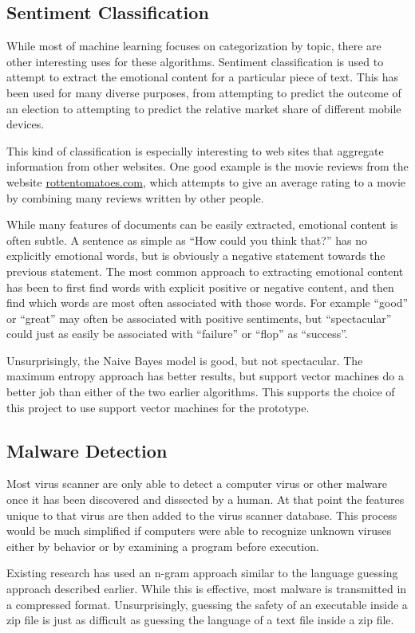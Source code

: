 \documentclass[12pt]{article}
\begin{document}
\subsection{Sentiment Classification}
While most of machine learning focuses on categorization by topic, there are other interesting uses for these
algorithms.  Sentiment classification is used to attempt to extract the emotional content for a particular
piece of text. This has been used for many diverse purposes, from attempting to predict the outcome of an
election to attempting to predict the relative market share of different mobile devices.

This kind of classification is especially interesting to web sites that aggregate information from other
websites. One good example is the movie reviews from the website \url{rottentomatoes.com}, which attempts to
give an average rating to a movie by combining many reviews written by other people. \cite{pang2002thumbs}

While many features of documents can be easily extracted, emotional content is often subtle. A sentence as
simple as ``How could you think that?'' has no explicitly emotional words, but is obviously a negative
statement towards the previous statement. The most common approach to extracting emotional content has been to
first find words with explicit positive or negative content, and then find which words are most often
associated with those words. For example ``good'' or ``great'' may often be associated with positive
sentiments, but ``spectacular'' could just as easily be associated with ``failure'' or ``flop'' as
``success''.

Unsurprisingly, the Naive Bayes model is good, but not spectacular. The maximum entropy approach has better
results, but support vector machines do a better job than either of the two earlier algorithms. This supports
the choice of this project to use support vector machines for the prototype.
\subsection{Malware Detection}
Most virus scanner are only able to detect a computer virus or other malware once it has been discovered and
dissected by a human. At that point the features unique to that virus are then added to the virus scanner
database.  This process would be much simplified if computers were able to recognize unknown viruses either by
behavior or by examining a program before execution.

Existing research has used an n-gram approach similar to the language guessing approach described
earlier. While this is effective, most malware is transmitted in a compressed format. Unsurprisingly, guessing
the safety of an executable inside a zip file is just as difficult as guessing the language of a text file
inside a zip file.  
\end{document}
